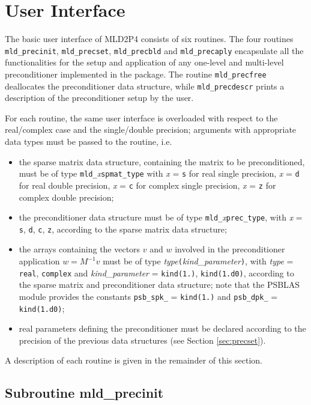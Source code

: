 \section{User Interface\label{sec:userinterface}}

The basic user interface of MLD2P4 consists of six routines. The four routines \verb|mld_precinit|,
\verb|mld_precset|, \verb|mld_precbld| and \verb|mld_precaply| encapsulate all the functionalities for the setup and application of any one-level and multi-level
preconditioner implemented in the package.
The routine \verb|mld_precfree| deallocates the preconditioner data structure, while
\verb|mld_precdescr| prints a description of the preconditioner setup by the user.

For each routine, the same user interface is overloaded with
respect to the real/complex case and the single/double precision;
arguments with appropriate data types must be passed to the routine,
i.e.
\begin{itemize}
\item the sparse matrix data structure, containing the matrix to be
  preconditioned, must be of type \verb|mld_|\emph{x}\verb|spmat_type|
	with \emph{x} = \verb|s| for real single precision, \emph{x} = \verb|d|
	for real double precision, \emph{x} = \verb|c| for complex single precision,
	\emph{x} = \verb|z| for complex double precision;
\item the preconditioner data structure must be of type
  \verb|mld_|\emph{x}\verb|prec_type|, with \emph{x} =    
  \verb|s|, \verb|d|, \verb|c|, \verb|z|, according to the sparse
  matrix data structure;
\item the arrays containing the vectors $v$ and $w$ involved in
  the preconditioner application $w=M^{-1}v$ must be of type   
  \emph{type}\verb|(|\emph{kind\_parameter}\verb|)|, with \emph{type} =
  \verb|real|, \verb|complex| and \emph{kind\_parameter} = \verb|kind(1.)|,
  \verb|kind(1.d0)|, according to the sparse matrix and preconditioner
  data structure; note that the PSBLAS module provides the constants \verb|psb_spk_|
  = \verb|kind(1.)| and \verb|psb_dpk_| = \verb|kind(1.d0)|;
\item real parameters defining the preconditioner must be declared
  according to the precision of the previous data structures
  (see Section \ref{sec:precset}).
\end{itemize}
A description of each routine is given in the remainder of this section.


\subsection{Subroutine mld\_precinit\label{sec:precinit}}

